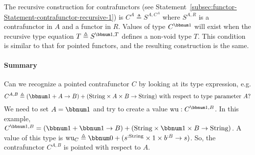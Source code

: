 The recursive construction for contrafunctors (see Statement~\ref{subsec:functor-Statement-contrafunctor-recursive-1})
is $C^{A}\triangleq S^{A,C^{A}}$ where $S^{A,R}$ is a contrafunctor
in $A$ and a functor in $R$. Values of type $C^{\bbnum 1}$ will
exist when the recursive type equation $T\triangleq S^{\bbnum 1,T}$
defines a non-void type $T$. This condition is similar to that for
pointed functors, and the resulting construction is the same.

\paragraph{Summary}

Can we recognize a pointed contrafunctor $C$ by looking at its type
expression, e.g.
\[
C^{A,B}\triangleq\left(\bbnum 1+A\rightarrow B\right)+(\text{String}\times A\times B\rightarrow\text{String})\text{ with respect to type parameter }A?
\]
We need to set $A=\bbnum 1$ and try to create a value $\text{wu}:C^{\bbnum 1,B}$.
In this example, $C^{\bbnum 1,B}=\left(\bbnum 1+\bbnum 1\rightarrow B\right)+(\text{String}\times\bbnum 1\times B\rightarrow\text{String})$.
A value of this type is $\text{wu}_{C}\triangleq\bbnum 0+(s^{:\text{String}}\times1\times b^{:B}\rightarrow s)$.
So, the contrafunctor $C^{A,B}$ is pointed with respect to $A$.

